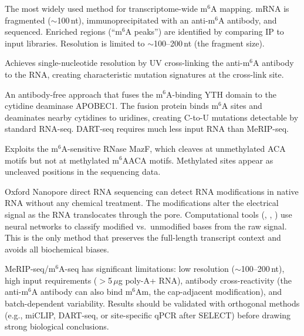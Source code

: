 \begin{description}[style=nextline, itemsep=3pt]
  \item[MeRIP-seq / m$^6$A-seq] The most widely used method for transcriptome-wide m$^6$A mapping. mRNA is fragmented ($\sim$100\,nt), immunoprecipitated with an anti-m$^6$A antibody, and sequenced. Enriched regions (``m$^6$A peaks'') are identified by comparing IP to input libraries. Resolution is limited to $\sim$100--200\,nt (the fragment size).

  \item[miCLIP (m$^6$A individual-nucleotide-resolution cross-linking and immunoprecipitation)] Achieves single-nucleotide resolution by UV cross-linking the anti-m$^6$A antibody to the RNA, creating characteristic mutation signatures at the cross-link site.

  \item[DART-seq (Deamination Adjacent to RNA modification Targets)] An antibody-free approach that fuses the m$^6$A-binding YTH domain to the cytidine deaminase APOBEC1. The fusion protein binds m$^6$A sites and deaminates nearby cytidines to uridines, creating C-to-U mutations detectable by standard RNA-seq. DART-seq requires much less input RNA than MeRIP-seq.

  \item[MAZTER-seq] Exploits the m$^6$A-sensitive RNase MazF, which cleaves at unmethylated ACA motifs but not at methylated m$^6$AACA motifs. Methylated sites appear as uncleaved positions in the sequencing data.

  \item[Direct nanopore detection] Oxford Nanopore direct RNA sequencing can detect RNA modifications in native RNA without any chemical treatment. The modifications alter the electrical signal as the RNA translocates through the pore. Computational tools (, , ) use neural networks to classify modified vs.\ unmodified bases from the raw signal. This is the only method that preserves the full-length transcript context and avoids all biochemical biases.
\end{description}

\begin{warningbox}
MeRIP-seq/m$^6$A-seq has significant limitations: low resolution ($\sim$100--200\,nt), high input requirements ($>$5\,$\mu$g poly-A+ RNA), antibody cross-reactivity (the anti-m$^6$A antibody can also bind m$^6$Am, the cap-adjacent modification), and batch-dependent variability. Results should be validated with orthogonal methods (e.g., miCLIP, DART-seq, or site-specific qPCR after SELECT) before drawing strong biological conclusions.
\end{warningbox}


